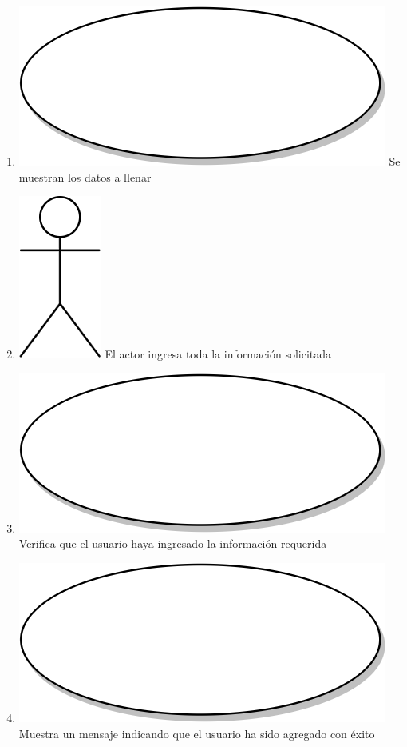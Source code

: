 \begin{enumerate}
\item {\includegraphics[scale=.05]{Capitulo3/img/proceso.png} Se muestran los datos a llenar}
\item {\includegraphics[scale=.1]{Capitulo3/img/actor.png} El actor ingresa toda la información solicitada}
\item {\includegraphics[scale=.05]{Capitulo3/img/proceso.png} Verifica que el usuario haya ingresado la información requerida}
\item {\includegraphics[scale=.05]{Capitulo3/img/proceso.png} Muestra un mensaje indicando que el usuario ha sido agregado con éxito}

\end{enumerate}
